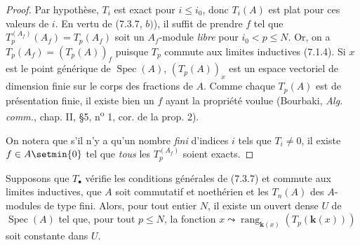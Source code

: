 \begin{proof}
Par hypothèse, $T_i$ est exact pour $i\leq i_0$, donc $T_i(A)$ est plat pour
ces valeurs de $i$. En vertu de (7.3.7, $b)$), il suffit de prendre $f$ tel que
$T_p^{(A_f)}(A_f)=T_p(A_f)$
soit un $A_f$-module \emph{libre} pour $i_0<p\leq N$. Or, on a
$T_p(A_f)=(T_p(A))_f$ puisque $T_p$ commute aux limites inductives (7.1.4). Si
$x$ est le point générique de $\operatorname{Spec}(A)$, $(T_p(A))_x$ est un
espace vectoriel de dimension finie sur le corps des fractions de $A$. Comme
chaque $T_p(A)$ est de présentation finie, il existe bien un $f$ ayant la
propriété voulue (Bourbaki, \emph{Alg. comm.}, chap. II, \S 5,
n\textsuperscript{o} 1, cor. de la prop. 2).

On notera que s'il n'y a qu'un nombre \emph{fini} d'indices $i$ tels que $T_i\ne0$,
il existe $f\in A\setmin\{0\}$ tel que \emph{tous} les $T_p^{(A_f)}$ soient exacts.
\end{proof}

\begin{corollary}[7.3.10]
Supposons que $T_\bullet$ vérifie les conditions générales de \textup{(7.3.7)} et
commute aux limites inductives, que $A$ soit commutatif et noethérien et les
$T_n(A)$ des $A$-modules de type fini. Alors, pour tout entier $N$, il existe
un ouvert dense $U$ de $\operatorname{Spec}(A)$ tel que, pour tout $p\leq N$,
la fonction
$x\leadsto\operatorname{rang}_{\mathbf{k}(x)}(T_p(\boldsymbol{k}(x)))$
soit constante dans $U$.
\end{corollary}

